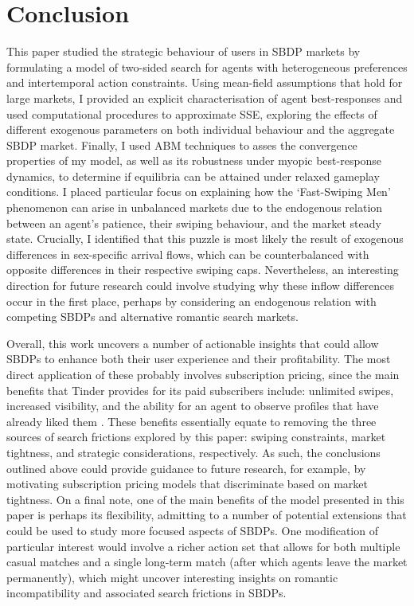 \section{Conclusion}
\label{sec:section5}
This paper studied the strategic behaviour of users in SBDP markets by formulating a model of two-sided search for agents with heterogeneous preferences and intertemporal action constraints. 
Using mean-field assumptions that hold for large markets, I provided an explicit characterisation of agent best-responses and used computational procedures to approximate SSE, exploring the effects of different exogenous parameters on both individual behaviour and the aggregate SBDP market.
Finally, I used ABM techniques to asses the convergence properties of my model, as well as its robustness under myopic best-response dynamics, to determine if equilibria can be attained under relaxed gameplay conditions.
I placed particular focus on explaining how the `Fast-Swiping Men' phenomenon can arise in unbalanced markets due to the endogenous relation between an agent's patience, their swiping behaviour, and the market steady state. 
Crucially, I identified that this puzzle is most likely the result of exogenous differences in sex-specific arrival flows, which can be counterbalanced with opposite differences in their respective swiping caps. 
Nevertheless, an interesting direction for future research could involve studying why these inflow differences occur in the first place, perhaps by considering an endogenous relation with competing SBDPs and alternative romantic search markets. 

Overall, this work uncovers a number of actionable insights that could allow SBDPs to enhance both their user experience and their profitability.
The most direct application of these probably involves subscription pricing, since the main benefits that Tinder provides for its paid subscribers include: unlimited swipes, increased visibility, and the ability for an agent to observe profiles that have already liked them \citep{web:tinder_subscription}.
These benefits essentially equate to removing the three sources of search frictions explored by this paper: swiping constraints, market tightness, and strategic considerations, respectively.
As such, the conclusions outlined above could provide guidance to future research, for example, by motivating subscription pricing models that discriminate based on market tightness.
On a final note, one of the main benefits of the model presented in this paper is perhaps its flexibility, admitting to a number of potential extensions that could be used to study more focused aspects of SBDPs. 
One modification of particular interest would involve a richer action set that allows for both multiple casual matches and a single long-term match (after which agents leave the market permanently), which might uncover interesting insights on romantic incompatibility and associated search frictions in SBDPs.